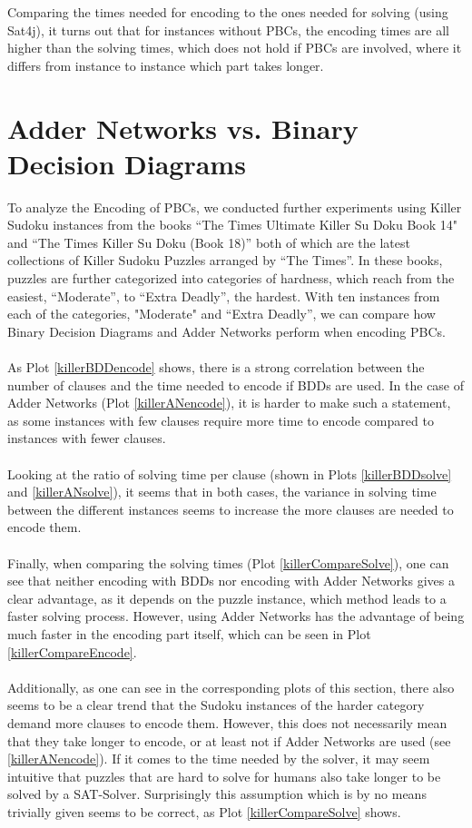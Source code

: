 Comparing the times needed for encoding to the ones needed for solving (using Sat4j), it turns out that for instances without PBCs, the encoding times are all higher than the solving times, which does not hold if PBCs are involved, where it differs from instance to instance which part takes longer.

\section{Adder Networks vs. Binary Decision Diagrams}
To analyze the Encoding of PBCs, we conducted further experiments using Killer Sudoku instances from the books ``The Times Ultimate Killer Su Doku Book 14"\cite{TheTimesUltimateKillerSuDokuBook14} and ``The Times Killer Su Doku (Book 18)''\cite{TheTimesKillerSuDokuBook18} both of which are the latest collections of Killer Sudoku Puzzles arranged by ``The Times''. In these books, puzzles are further categorized into categories of hardness, which reach from the easiest, ``Moderate'', to ``Extra Deadly'', the hardest. With ten instances from each of the categories, "Moderate" and  ``Extra Deadly'', we can compare how Binary Decision Diagrams and Adder Networks perform when encoding PBCs.\\
\\
As Plot \ref{killerBDDencode} shows, there is a strong correlation between the number of clauses and the time needed to encode if BDDs are used. In the case of Adder Networks (Plot \ref{killerANencode}), it is harder to make such a statement, as some instances with few clauses require more time to encode compared to instances with fewer clauses.\\
\\
Looking at the ratio of solving time per clause (shown in Plots \ref{killerBDDsolve} and \ref{killerANsolve}), it seems that in both cases, the variance in solving time between the different instances seems to increase the more clauses are needed to encode them.\\
\\
Finally, when comparing the solving times (Plot \ref{killerCompareSolve}), one can see that neither encoding with BDDs nor encoding with Adder Networks gives a clear advantage, as it depends on the puzzle instance, which method leads to a faster solving process. However, using Adder Networks has the advantage of being much faster in the encoding part itself, which can be seen in Plot \ref{killerCompareEncode}.\\
\\
Additionally, as one can see in the corresponding plots of this section, there also seems to be a clear trend that the Sudoku instances of the harder category demand more clauses to encode them. However, this does not necessarily mean that they take longer to encode, or at least not if Adder Networks are used (see \ref{killerANencode}). If it comes to the time needed by the solver, it may seem intuitive that puzzles that are hard to solve for humans also take longer to be solved by a SAT-Solver. Surprisingly this assumption which is by no means trivially given seems to be correct, as Plot \ref{killerCompareSolve} shows. 


